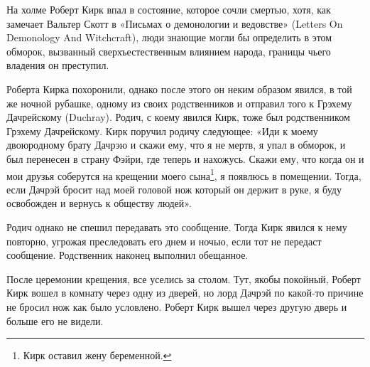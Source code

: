 На холме Роберт Кирк впал в состояние, которое сочли смертью, хотя, как замечает Вальтер Скотт в «Письмах о демонологии и ведовстве» (Letters On Demonology And Witchcraft), люди знающие могли бы определить в этом обморок, вызванный сверхъестественным влиянием народа, границы чьего владения он преступил. 

Роберта Кирка похоронили, однако после этого он неким образом явился, в той же ночной рубашке, одному из своих родственников и отправил того к Грэхему Дачрейскому (Duchray). Родич, с коему явился Кирк, тоже был родственником Грэхему Дачрейскому. Кирк поручил родичу следующее: «Иди к моему двоюродному брату Дачрэю и скажи ему, что я не мертв, я упал в обморок, и был перенесен в страну Фэйри, где теперь и нахожусь. Скажи ему, что когда он и мои друзья соберутся на крещении моего сына\footnote{Кирк оставил жену беременной.}, я появлюсь в помещении. Тогда, если Дачрэй бросит  над моей головой нож который он держит в руке, я буду освобожден и вернусь к обществу людей».

Родич однако не спешил передавать это сообщение. Тогда Кирк явился к нему повторно, угрожая преследовать его днем и ночью, если тот не передаст сообщение. Родственник наконец выполнил обещанное.

После церемонии крещения, все уселись за столом. Тут, якобы покойный, Роберт Кирк вошел в комнату через одну из дверей, но лорд Дачрэй по какой-то причине не бросил нож как было условлено. Роберт Кирк вышел через другую дверь и больше его не видели.




